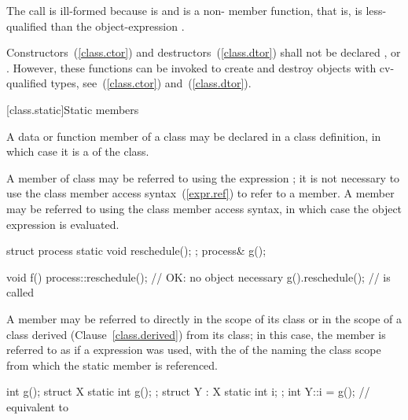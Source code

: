 The call  is ill-formed because  is 
and  is a non- member function, that is,
 is less-qualified than the object-expression .
\exitexample

\pnum
{}%
%
%
%
Constructors~(\ref{class.ctor}) and destructors~(\ref{class.dtor}) shall
not be declared ,  or 
. \enternote However, these functions can be invoked to
create and destroy objects with cv-qualified types,
see~(\ref{class.ctor}) and~(\ref{class.dtor}).
\exitnote

[class.static]{Static members}%
%
%

\pnum
A data or function member of a class may be declared  in a
class definition, in which case it is a  of the class.

\pnum
A  member  of class  may be referred to
using the  expression ; it is not
necessary to use the class member access syntax~(\ref{expr.ref}) to
refer to a  member. A  member may be
referred to using the class member access syntax, in which case the
object expression is evaluated.
\enterexample

\begin{codeblock}
struct process {
  static void reschedule();
};
process& g();

void f() {
  process::reschedule();        // OK: no object necessary
  g().reschedule();             //  is called
}
\end{codeblock}
\exitexample

\pnum
A  member may be referred to directly in the scope of its
class or in the scope of a class derived (Clause~\ref{class.derived})
from its class; in this case, the  member is referred to
as if a  expression was used, with the
 of the  naming
the class scope from which the static member is referenced.
\enterexample

\begin{codeblock}
int g();
struct X {
  static int g();
};
struct Y : X {
  static int i;
};
int Y::i = g();                 // equivalent to 
\end{codeblock}
\exitexample

